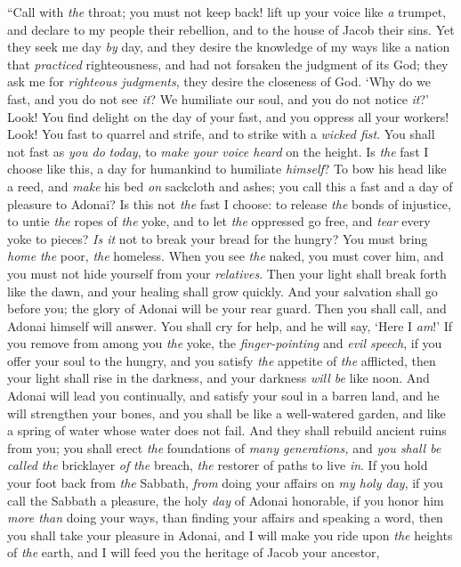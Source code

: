 \begin{biblechapter} %
 “Call with \textit{the} throat; you must not keep back! 
lift up your voice like \textit{a} trumpet, 
and declare to my people their rebellion, 
and to the house of Jacob their sins.
\verse Yet they seek me day \textit{by} day, 
and they desire the knowledge of my ways 
like a nation that \textit{practiced} righteousness, 
and had not forsaken the judgment of its God; 
they ask me for \textit{righteous judgments}, 
they desire the closeness of God.
\verse ‘Why do we fast, and you do not see \textit{it}? 
We humiliate our soul, and you do not notice \textit{it}?’ 
Look! You find delight on the day of your fast, 
and you oppress all your workers!
\verse Look! You fast to quarrel and strife, 
and to strike with a \textit{wicked fist}. 
You shall not fast as \textit{you do} \textit{today}, 
to \textit{make your voice heard} on the height.
\verse Is \textit{the} fast I choose like this, 
a day for humankind to humiliate \textit{himself}? 
To bow his head like a reed, 
and \textit{make} his bed \textit{on} sackcloth and ashes; 
you call this a fast 
and a day of pleasure to Adonai?
\verse Is this not \textit{the} fast I choose: to release \textit{the} bonds of injustice, 
to untie \textit{the} ropes of \textit{the} yoke, 
and to let \textit{the} oppressed go free, 
and \textit{tear} every yoke to pieces?
\verse \textit{Is it} not to break your bread for the hungry? 
You must bring \textit{home} \textit{the} poor, \textit{the} homeless. 
When you see \textit{the} naked, you must cover him, 
and you must not hide yourself from your \textit{relatives}.
\verse Then your light shall break forth like the dawn, 
and your healing shall grow quickly. 
And your salvation shall go before you; 
the glory of Adonai will be your rear guard.
\verse Then you shall call, and Adonai himself will answer. 
You shall cry for help, and he will say, ‘Here I \textit{am}!’ 
If you remove from among you \textit{the} yoke, 
the \textit{finger-pointing} and \textit{evil speech},
\verse if you offer your soul to the hungry, 
and you satisfy \textit{the} appetite of \textit{the} afflicted, 
then your light shall rise in the darkness, 
and your darkness \textit{will be} like noon.
\verse And Adonai will lead you continually, and satisfy your soul in a barren land, 
and he will strengthen your bones, 
and you shall be like a well-watered garden, 
and like a spring of water whose water does not fail.
\verse And they shall rebuild ancient ruins from you; 
you shall erect \textit{the} foundations of \textit{many generations,} 
and \textit{you shall be called} \textit{the} bricklayer \textit{of} \textit{the} breach, 
\textit{the} restorer of paths to live \textit{in}.
\verse If you hold your foot back from \textit{the} Sabbath, 
\textit{from} doing your affairs on \textit{my holy day}, 
if you call the Sabbath a pleasure, 
the holy \textit{day} of Adonai honorable, 
if you honor him \textit{more than} doing your ways, 
than finding your affairs and speaking a word,
\verse then you shall take your pleasure in Adonai, 
and I will make you ride upon \textit{the} heights of \textit{the} earth, 
and I will feed you the heritage of Jacob your ancestor,
\end{biblechapter}

